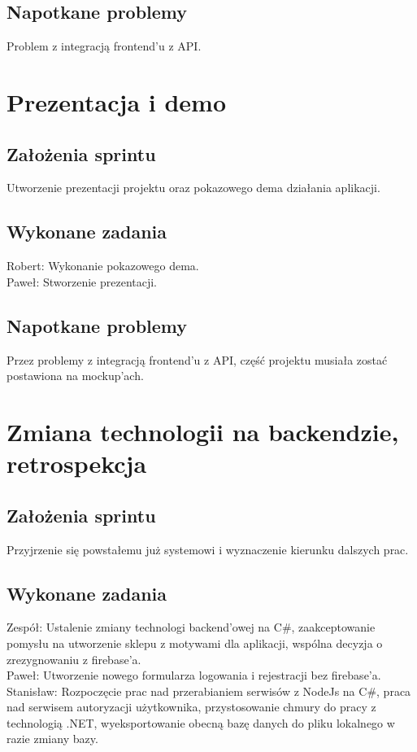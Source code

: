 \documentclass[a4paper,11pt]{report}
\begin{document}
\subsection {Napotkane problemy}
Problem z integracją frontend'u z API.

\section {Prezentacja i demo}
\subsection {Założenia sprintu}
Utworzenie prezentacji projektu oraz pokazowego dema działania aplikacji.
\subsection {Wykonane zadania}
Robert: Wykonanie pokazowego dema. \\
Paweł: Stworzenie prezentacji.\\
\subsection {Napotkane problemy}
Przez problemy z integracją frontend'u z API, część projektu musiała zostać postawiona na mockup'ach.

\section {Zmiana technologii na backendzie, retrospekcja}
\subsection {Założenia sprintu}
Przyjrzenie się powstałemu już systemowi i wyznaczenie kierunku dalszych prac.
\subsection {Wykonane zadania}
Zespół: Ustalenie zmiany technologi backend'owej na C\#, zaakceptowanie pomysłu na utworzenie sklepu z motywami dla aplikacji, wspólna decyzja o zrezygnowaniu z firebase'a.\\
Paweł: Utworzenie nowego formularza logowania i rejestracji bez firebase'a.\\
Stanisław: Rozpoczęcie prac nad przerabianiem serwisów z NodeJs na C\#, praca nad serwisem autoryzacji użytkownika, przystosowanie chmury do pracy z technologią .NET, wyeksportowanie obecną bazę danych do pliku lokalnego w razie zmiany bazy.\\
\end{document}
